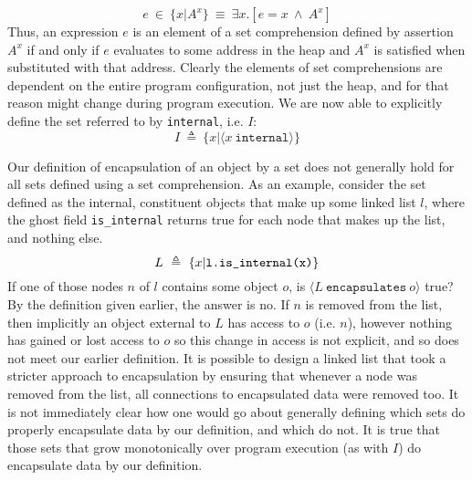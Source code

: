 \documentclass[12pt]{article}
\newcommand\encapsulates[2]{\langle #1\ \texttt{encapsulates}\ #2 \rangle}
\newcommand\internal[1]{\langle #1\ \texttt{internal}\rangle}
\newcommand\comprehension[2]{\{#1 | #2\}}
\numberwithin{case}{lemma}
\numberwithin{case}{theorem}
\numberwithin{subcase}{case}
\begin{document}
$$e\ \in\ \comprehension{x}{A^x}\ \equiv\ \exists x.[e = x\ \wedge\ A^x]$$
Thus, an expression $e$ is an element of a set comprehension defined by assertion $A^x$ 
if and only if
$e$ evaluates to some address in the heap and $A^x$ is satisfied when substituted with that address.
Clearly the elements of set comprehensions are dependent on the entire program configuration, 
not just the heap, and for that reason might change during program execution. We are 
now able to explicitly define the set referred to by \texttt{internal}, i.e. $I$:
$$I\ \triangleq\ \comprehension{x}{\internal x}$$

Our definition of encapsulation of an object by a set does not generally hold
for all sets defined using a set comprehension. As an example, consider the set
defined as the internal, constituent objects that make up some linked list $l$, 
where the ghost field \texttt{is\_internal} returns true for each node that makes 
up the list, and nothing else.
$$L\ \triangleq\ \comprehension{x}{\texttt{l.\texttt{is\_internal(x)}}}$$
If one of those nodes $n$ of $l$ contains some object $o$, is $\encapsulates{L}{o}$
true? By the definition given earlier, the answer is no. If $n$ is removed from the list,
then implicitly an object external to $L$ has access to $o$ (i.e. $n$), however 
nothing has gained or lost access to $o$ so this change in access is not explicit, and so 
does not meet our earlier definition. It is possible to design a linked list that 
took a stricter approach to encapsulation by ensuring that whenever a node was removed 
from the list, all connections to encapsulated data were removed too.
It is not immediately clear how one would
go about generally defining which sets do properly encapsulate data by our definition, and which do not.
It is true that those sets that grow monotonically over program execution (as with $I$)
do encapsulate data by our definition.
\end{document}
